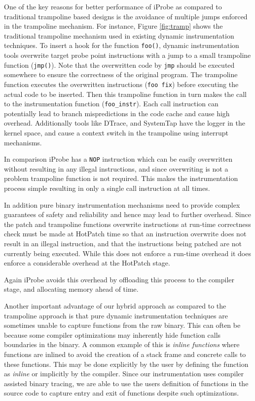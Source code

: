 One of the key reasons for better performance of iProbe as compared to traditional trampoline based designs is the avoidance of multiple jumps enforced in the trampoline mechanism. 
For instance, Figure \ref{fig:tramp} shows the traditional trampoline mechanism used in existing dynamic instrumentation techniques. 
To insert a hook for the function \texttt{foo()}, dynamic instrumentation tools overwrite target probe point instructions with a jump to a small trampoline function (\texttt{jmp()}).
Note that the overwritten code by \texttt{jmp} should be executed somewhere to ensure the correctness of the original program.
The trampoline function executes the overwritten instructions (\texttt{foo fix}) before executing the actual code to be inserted. 
Then this trampoline function in turn makes the call to the instrumentation function (\texttt{foo\_instr}).
Each call instruction can potentially lead to branch mispredictions in the code cache and cause high overhead.
Additionally tools like DTrace, and SystemTap \cite{dtrace,systemtap} have the logger in the kernel space, and cause a context switch in the trampoline using interrupt mechanisms. 

In comparison iProbe has a \texttt{NOP} instruction which can be easily overwritten without resulting in any illegal instructions, and since overwriting is not a problem trampoline function is not required.
This makes the instrumentation process simple resulting in only a single call instruction at all times.

In addition pure binary instrumentation mechanisms need to provide complex guarantees of safety and reliability and hence may lead to further overhead.
Since the patch and trampoline functions overwrite instructions at run-time correctness check must be made at HotPatch time so that an instruction overwrite does not result in an illegal instruction, and that the instructions being patched are not currently being executed.
While this does not enforce a run-time overhead it does enforce a considerable overhead at the HotPatch stage.

Again iProbe avoids this overhead by offloading this process to the compiler stage, and allocating memory ahead of time.


Another important advantage of our hybrid approach as compared to the trampoline approach is that pure dynamic instrumentation techniques are sometimes unable to capture functions from the raw binary. 
This can often be because some compiler optimizations may inherently hide function calls boundaries in the binary. 
A common example of this is \emph{inline functions} where functions are inlined to avoid the creation of a stack frame and concrete calls to these functions. 
This may be done explicitly by the user by defining the function as \emph{inline} or implicitly by the compiler. 
Since our instrumentation uses compiler assisted binary tracing, we are able to use the users definition of functions in the source code to capture entry and exit of functions despite such optimizations.
